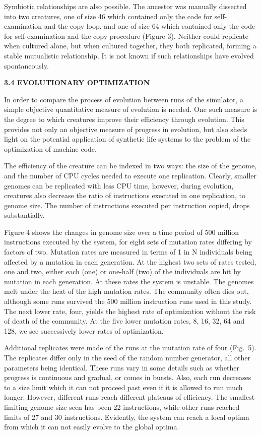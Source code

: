 Symbiotic relationships are also possible.  The ancestor was manually dissected
into two creatures, one of size 46 which contained only the code for
self-examination and the copy loop, and one of size 64 which contained only
the code for self-examination and the copy procedure (Figure 3).  Neither
could replicate when cultured alone, but when cultured together, they both
replicated, forming a stable mutualistic relationship.  It is not known if
such relationships have evolved spontaneously.

\LP
\bf 3.4 EVOLUTIONARY OPTIMIZATION\rm
\eLP

In order to compare the process of evolution between runs of the simulator,
a simple objective quantitative measure of evolution is needed.  One such
measure is the degree to which creatures improve their efficiency through
evolution.  This provides not only an objective measure of progress in
evolution, but also sheds light on the potential application of synthetic
life systems to the problem of the optimization of machine code.

The efficiency of the creature can be indexed in two ways: the size of the
genome, and the number of CPU cycles needed to execute one replication.
Clearly, smaller genomes can be replicated with less CPU time, however,
during evolution, creatures also decrease the ratio of instructions executed
in one replication, to genome size.  The number of instructions executed per
instruction copied, drops substantially.

Figure 4 shows the changes in genome size over a time period of 500 million
instructions executed by the system, for eight sets of mutation rates
differing by factors of two.  Mutation rates are measured in terms of 1 in
N individuals being affected by a mutation in each generation.  At the highest
two sets of rates tested, one and two, either each (one) or one-half (two)
of the individuals are hit by mutation in each generation.  At these rates
the system is unstable.  The genomes melt under the heat of the high mutation
rates.  The community often dies out, although some runs survived the 500
million instruction runs used in this study.  The next lower rate, four,
yields the highest rate of optimization without the risk of death of the
community.  At the five lower mutation rates, 8, 16, 32, 64 and 128,
we see successively lower rates of optimization.

Additional replicates were made of the runs at the mutation rate of four
(Fig.\ 5).  The replicates differ only in the seed of the
random number generator, all other parameters being identical.  These runs
vary in some details such as whether progress is continuous and gradual, or
comes in bursts.  Also, each run decreases to a size limit which it can not
proceed past even if it is allowed to run much longer.  However, different
runs reach different plateaus of efficiency.  The smallest limiting genome
size seen has been 22 instructions, while other runs reached limits of 27
and 30 instructions.  Evidently, the system can reach a local optima from
which it can not easily evolve to the global optima.

